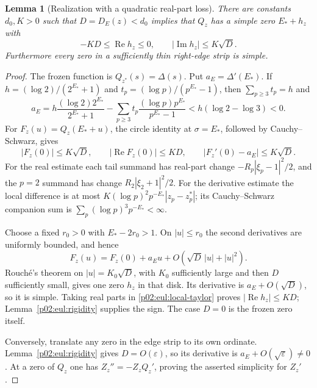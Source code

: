 \documentclass[11pt,letterpaper]{article}
\newtheorem{lemma}[theorem]{Lemma}
\theoremstyle{definition}
\theoremstyle{remark}
\newcommand{\eps}{\varepsilon}
\renewcommand{\Re}{\operatorname{Re}}
\renewcommand{\Im}{\operatorname{Im}}
\newcommand{\1}{\mathbf 1}
\begin{document}
\begin{lemma}[Realization with a quadratic real-part loss]
\label{p02:eul:local-critical}
There are constants $d_0,K>0$ such that $D=D_E(z)<d_0$ implies that
$Q_z$ has a simple zero $E_*+h_z$ with
\begin{equation}\label{p02:eul:local-bounds}
 -KD\le\Re h_z\le0,\qquad |\Im h_z|\le K\sqrt D.
\end{equation}
Furthermore every zero in a sufficiently thin right-edge strip is
simple.
\end{lemma}

\begin{proof}
The frozen function is $Q_{z^*}(s)=\Delta(s)$. Put
$a_E=\Delta'(E_*)$. If
$h=(\log2)/(2^{E_*}+1)$ and
$t_p=(\log p)/(p^{E_*}-1)$, then $\sum_{p\ge3}t_p=h$ and
\[
 a_E=h\frac{(\log2)2^{E_*}}{2^{E_*}+1}
 -\sum_{p\ge3}t_p\frac{(\log p)p^{E_*}}{p^{E_*}-1}
 <h(\log2-\log3)<0.
\]
For $F_z(u)=Q_z(E_*+u)$, the circle identity at $\sigma=E_*$,
followed by Cauchy--Schwarz, gives
\begin{equation}\label{p02:eul:taylor-data}
 |F_z(0)|\le K\sqrt D,\qquad
 |\Re F_z(0)|\le KD,\qquad
 |F_z'(0)-a_E|\le K\sqrt D.
\end{equation}
For the real estimate each tail summand has real-part change
$-R_p|\xi_p-1|^2/2$, and the $p=2$ summand has change
$R_2|\xi_2+1|^2/2$. For the derivative estimate the local difference
is at most $K(\log p)^2p^{-E_*}|z_p-z_p^*|$; its
Cauchy--Schwarz companion sum is
$\sum_p(\log p)^3p^{-E_*}<\infty$.

Choose a fixed $r_0>0$ with $E_*-2r_0>1$. On $|u|\le r_0$
the second derivatives are uniformly bounded, and hence
\begin{equation}\label{p02:eul:local-taylor}
 F_z(u)=F_z(0)+a_Eu+O(\sqrt D\,|u|+|u|^2).
\end{equation}
Rouch\'e's theorem on $|u|=K_0\sqrt D$, with $K_0$ sufficiently
large and then $D$ sufficiently small, gives one zero $h_z$ in
that disk. Its derivative is $a_E+O(\sqrt D)$, so it is simple.
Taking real parts in \eqref{p02:eul:local-taylor} proves
$|\Re h_z|\le KD$; Lemma~\ref{p02:eul:rigidity} supplies the sign.
The case $D=0$ is the frozen zero itself.

Conversely, translate any zero in the edge strip to its own ordinate.
Lemma~\ref{p02:eul:rigidity} gives $D=O(\eps)$, so its derivative is
$a_E+O(\sqrt\eps)\ne0$. At a zero of $Q_z$ one has
$Z_z''=-Z_zQ_z'$, proving the asserted simplicity for $Z_z'$.
\end{proof}
\end{document}
